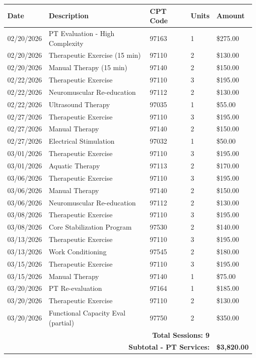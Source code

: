 \documentclass[11pt]{article}
\begin{document}
\begin{longtable}{@{}p{2cm}p{5.5cm}p{2cm}p{1.5cm}p{2.5cm}@{}}
\toprule
\textbf{Date} & \textbf{Description} & \textbf{CPT Code} & \textbf{Units} & \textbf{Amount} \\
\midrule
\endhead

02/20/2026 & PT Evaluation - High Complexity & 97163 & 1 & \$275.00 \\
02/20/2026 & Therapeutic Exercise (15 min) & 97110 & 2 & \$130.00 \\
02/20/2026 & Manual Therapy (15 min) & 97140 & 2 & \$150.00 \\
\midrule
02/22/2026 & Therapeutic Exercise & 97110 & 3 & \$195.00 \\
02/22/2026 & Neuromuscular Re-education & 97112 & 2 & \$130.00 \\
02/22/2026 & Ultrasound Therapy & 97035 & 1 & \$55.00 \\
\midrule
02/27/2026 & Therapeutic Exercise & 97110 & 3 & \$195.00 \\
02/27/2026 & Manual Therapy & 97140 & 2 & \$150.00 \\
02/27/2026 & Electrical Stimulation & 97032 & 1 & \$50.00 \\
\midrule
03/01/2026 & Therapeutic Exercise & 97110 & 3 & \$195.00 \\
03/01/2026 & Aquatic Therapy & 97113 & 2 & \$170.00 \\
\midrule
03/06/2026 & Therapeutic Exercise & 97110 & 3 & \$195.00 \\
03/06/2026 & Manual Therapy & 97140 & 2 & \$150.00 \\
03/06/2026 & Neuromuscular Re-education & 97112 & 2 & \$130.00 \\
\midrule
03/08/2026 & Therapeutic Exercise & 97110 & 3 & \$195.00 \\
03/08/2026 & Core Stabilization Program & 97530 & 2 & \$140.00 \\
\midrule
03/13/2026 & Therapeutic Exercise & 97110 & 3 & \$195.00 \\
03/13/2026 & Work Conditioning & 97545 & 2 & \$180.00 \\
\midrule
03/15/2026 & Therapeutic Exercise & 97110 & 3 & \$195.00 \\
03/15/2026 & Manual Therapy & 97140 & 1 & \$75.00 \\
\midrule
03/20/2026 & PT Re-evaluation & 97164 & 1 & \$185.00 \\
03/20/2026 & Therapeutic Exercise & 97110 & 2 & \$130.00 \\
03/20/2026 & Functional Capacity Eval (partial) & 97750 & 2 & \$350.00 \\
\midrule
\multicolumn{4}{r}{\textbf{Total Sessions: 9}} & \\
\multicolumn{4}{r}{\textbf{Subtotal - PT Services:}} & \textbf{\$3,820.00} \\
\bottomrule
\end{longtable}
\end{document}
